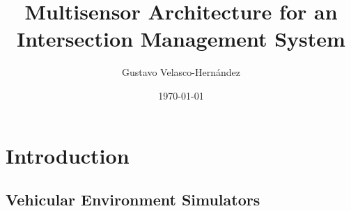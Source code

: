 \documentclass{book}
\begin{document}
\title{Multisensor Architecture for an Intersection Management System}
\vfill
\vfill
\vfill
\author{Gustavo Velasco-Hernández}
\vfill
\vfill
\vfill
\date{\today}
\maketitle

\tableofcontents
\setcounter{tocdepth}{3}

\listoffigures

\listoftables

\chapter {Introduction}
















\begin{appendices}
	\chapter {Vehicular Environment Simulators}
	
\end{appendices}



%
\end{document}

